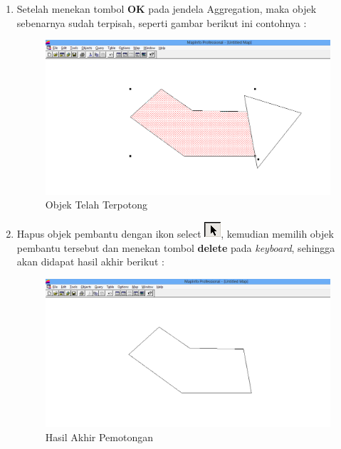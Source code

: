 \begin{enumerate}[\bfseries A.]
\begin{enumerate}[1.]
    \item Setelah menekan tombol \textbf{OK} pada jendela Aggregation, maka objek sebenarnya sudah terpisah, seperti gambar berikut ini contohnya :
    
    \begin{figure}[H]
      \centering
      \includegraphics[width=1\textwidth]{./resources/030-objek-telah-terpotong}
      \caption{Objek Telah Terpotong}
    \end{figure}
    
    \item Hapus objek pembantu dengan ikon select \includegraphics{./resources/008-ikon-select}, kemudian memilih objek pembantu tersebut dan menekan tombol \textbf{delete} pada \textit{keyboard}, sehingga akan didapat hasil akhir berikut :
    
    \begin{figure}[H]
      \centering
      \includegraphics[width=1\textwidth]{./resources/031-hasil-akhir-erase}
      \caption{Hasil Akhir Pemotongan}
    \end{figure}
  \end{enumerate}
  

\end{enumerate}
